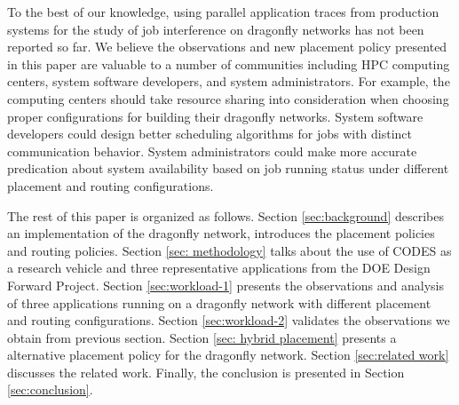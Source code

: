 To the best of our knowledge, using parallel application traces from production systems for the study of job interference on dragonfly networks has not been reported so far. We believe the observations and new placement policy presented in this paper are valuable to a number of communities including HPC computing centers, system software developers, and system administrators. For example, the computing centers should take resource sharing into consideration when choosing proper configurations for building their dragonfly networks. System software developers could design better scheduling algorithms for jobs with distinct communication behavior. System administrators could make more accurate predication about system availability based on job running status under different placement and routing configurations.


The rest of this paper is organized as follows. Section \ref{sec:background} describes an implementation of the dragonfly network, introduces the placement policies and routing policies. Section \ref{sec: methodology} talks about the use of CODES as a research vehicle and three representative applications from the DOE Design Forward Project. Section \ref{sec:workload-1} presents the observations and analysis of three applications running on a dragonfly network with different placement and routing configurations. Section \ref{sec:workload-2} validates the observations we obtain from previous section. Section \ref{sec: hybrid placement} presents a alternative placement policy for the dragonfly network. Section \ref{sec:related work} discusses the related work. Finally, the conclusion is presented in Section \ref{sec:conclusion}.


